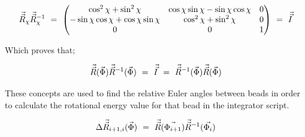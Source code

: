\documentclass[11pt]{article}
\begin{document}
\begin{equation}
\vec{\vec{R}}_{\chi} \vec{\vec{R}}_{\chi}^{-1} 
\hspace{0.125cm} = \hspace{0.125cm} 
\begin{pmatrix}
\cos^{2}{\chi} + \sin^{2}{\chi} & \cos{\chi} \sin{\chi} - \sin{\chi} \cos{\chi} & 0 \\
- \sin{\chi} \cos{\chi} + \cos{\chi} \sin{\chi} & \cos^{2}{\chi} + \sin^{2}{\chi} & 0 \\
0 & 0 & 1 
\end{pmatrix}
\hspace{0.125cm} = \hspace{0.125cm} \vec{\vec{I}}
\end{equation}

Which proves that;

\begin{equation}
    \vec{\vec{R}} ( \vec{\Phi} )  \vec{\vec{R}}^{-1} ( \vec{\Phi} ) \hspace{0.125cm} = \hspace{0.125cm} \vec{\vec{I}}  \hspace{0.125cm} = \hspace{0.125cm}  \vec{\vec{R}}^{-1} ( \vec{\Phi} )  \vec{\vec{R}} ( \vec{\Phi} )
\end{equation}

These concepts are used to find the relative Euler angles between beads in order to calculate the rotational energy value for that bead in the integrator script. 

\begin{equation}
    \Delta \vec{\vec{R}}_{i+1, i} ( \vec{\Phi} )  \hspace{0.125cm} = \hspace{0.125cm} \vec{\vec{R}} ( \vec{\Phi_{i+1}} )  \vec{\vec{R}}^{-1} ( \vec{\Phi_{i}} ) 
\end{equation}
\end{document}
